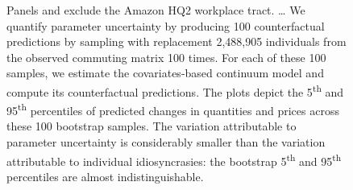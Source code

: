\documentclass[11pt]{article}
\theoremstyle{definition}
\begin{document}
\begin{figure}[h!]
\begin{center}
\begin{minipage}{0.96\textwidth}
{Panels  and  exclude the Amazon HQ2 workplace tract.
\dots
We quantify parameter uncertainty by producing 100 counterfactual predictions by
sampling with replacement 2,488,905 individuals from the observed commuting matrix 100 times.
For each of these 100 samples,
we estimate the covariates-based continuum model and compute its counterfactual predictions.
The plots depict the 5\textsuperscript{th} and 95\textsuperscript{th} percentiles of predicted changes in quantities and prices across these 100 bootstrap samples.
The variation attributable to parameter uncertainty is considerably smaller 
than 
the variation attributable to individual idiosyncrasies:
the bootstrap 5\textsuperscript{th} and 95\textsuperscript{th} percentiles are almost indistinguishable.
\par}
\end{minipage}
\end{center}
\end{figure}
\end{document}
